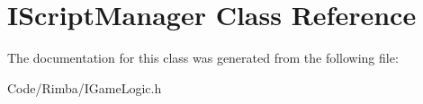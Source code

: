 \hypertarget{class_i_script_manager}{}\section{I\+Script\+Manager Class Reference}
\label{class_i_script_manager}


The documentation for this class was generated from the following file\+:\begin{DoxyCompactItemize}
\item 
Code/\+Rimba/I\+Game\+Logic.\+h\end{DoxyCompactItemize}
